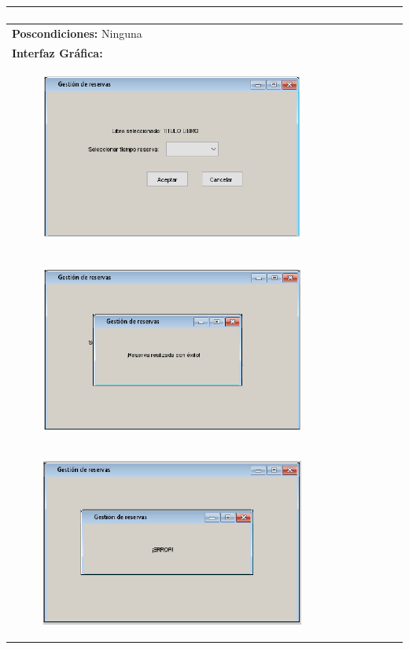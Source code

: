\documentclass{report}
\begin{document}
\begin{center}
\begin{longtable}{|p{\linewidth}|}
\begin{enumerate}
                    \end{enumerate}\\
                    \hline
                    \textbf{Poscondiciones:} Ninguna\\
                    \hline
                    \textbf{Interfaz Gráfica:}\\
                    \begin{figure}[H]
                        \centering
                        \includegraphics[width=0.8\textwidth]{./img/grafico/GestionDeReservas1.PNG}
                    \end{figure}\\
                    \begin{figure}[H]
                        \centering
                        \includegraphics[width=0.8\textwidth]{./img/grafico/GestionDeReservas2.PNG}
                    \end{figure}\\
                    \begin{figure}[H]
                        \centering
                        \includegraphics[width=0.8\textwidth]{./img/grafico/GestionDeReservas3.PNG}

\end{figure}
\end{longtable}
\end{center}
\end{document}
